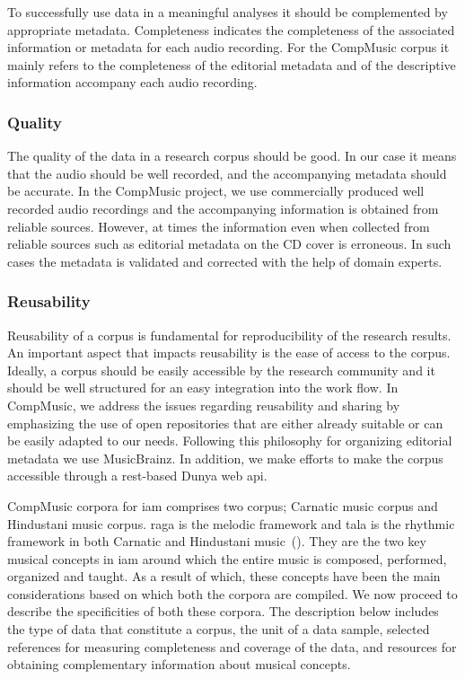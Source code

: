 To successfully use data in a meaningful analyses it should be complemented by appropriate metadata. Completeness indicates the completeness of the associated information or metadata for each audio recording. For the CompMusic corpus it mainly refers to the completeness of the editorial metadata and of the descriptive information accompany each audio recording. 

\subsubsection{Quality}

The quality of the data in a research corpus should be good. In our case it means that the audio should be well recorded, and the accompanying metadata should be accurate. In the CompMusic project, we use commercially produced well recorded audio recordings and the accompanying information is obtained from reliable sources. However, at times the information even when collected from reliable sources such as editorial metadata on the CD cover is erroneous. In such cases the metadata is validated and corrected with the help of domain experts. 

\subsubsection{Reusability}

Reusability of a corpus is fundamental for reproducibility of the research results. An important aspect that impacts reusability is the ease of access to the corpus. Ideally, a corpus should be easily accessible by the research community and it should be well structured for an easy integration into the work flow. In CompMusic, we address the issues regarding reusability and sharing by emphasizing the use of open repositories that are either already suitable or can be easily adapted to our needs. Following this philosophy for organizing editorial metadata we use MusicBrainz. In addition, we make efforts to make the corpus  accessible through a \acrshort{rest}-based Dunya web \gls{api}.

CompMusic corpora for \gls{iam} comprises two corpus; Carnatic music corpus and Hindustani music corpus. \Gls{raga} is the melodic framework and \gls{tala} is the rhythmic framework in both Carnatic and Hindustani music~(). They are the two key musical concepts in \gls{iam} around which the entire music is composed, performed, organized and taught. As a result of which, these concepts have been the main considerations based on which both the corpora are compiled.  We now proceed to describe the specificities of both these corpora. The description below includes the type of data that constitute a corpus, the unit of a data sample, selected references for measuring completeness and coverage of the data, and resources for obtaining complementary information about musical concepts. 


